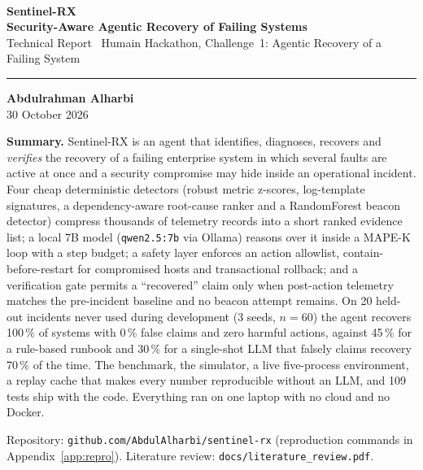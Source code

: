 \documentclass[11pt,a4paper]{article}
\newcommand{\code}[1]{\texttt{#1}}
\newcommand{\pct}[1]{#1\,\%}
\begin{document}
\begin{titlepage}
\thispagestyle{empty}
\vspace*{2.2cm}
\noindent{\color{accent}\rule{\textwidth}{1.2pt}}\\[1.2em]
{\color{accent}\Huge\bfseries Sentinel-RX}\\[0.4em]
{\color{accent}\LARGE\bfseries Security-Aware Agentic Recovery of Failing Systems}\\[1.0em]
{\large Technical Report \textemdash\ Humain Hackathon, Challenge~1: Agentic Recovery of a Failing System}\\[0.6em]
{\color{accent}\rule{\textwidth}{1.2pt}}

\vspace{2.0cm}
{\large\bfseries Abdulrahman Alharbi}\\[0.3em]
{\large 30 October 2026}

\vspace{2.2cm}
\begin{summarybox}
\small\textbf{Summary.}
Sentinel-RX is an agent that identifies, diagnoses, recovers and \emph{verifies} the recovery of a
failing enterprise system in which several faults are active at once and a security compromise may
hide inside an operational incident. Four cheap deterministic detectors (robust metric z-scores,
log-template signatures, a dependency-aware root-cause ranker and a RandomForest beacon detector)
compress thousands of telemetry records into a short ranked evidence list; a local 7B model
(\code{qwen2.5:7b} via Ollama) reasons over it inside a MAPE-K loop with a step budget; a safety layer
enforces an action allowlist, contain-before-restart for compromised hosts and transactional rollback;
and a verification gate permits a ``recovered'' claim only when post-action telemetry matches the
pre-incident baseline and no beacon attempt remains. On 20 held-out incidents never used during
development (3 seeds, $n=60$) the agent recovers \pct{100} of systems with \pct{0} false claims and
zero harmful actions, against \pct{45} for a rule-based runbook and \pct{30} for a single-shot LLM
that falsely claims recovery \pct{70} of the time. The benchmark, the simulator, a live five-process
environment, a replay cache that makes every number reproducible without an LLM, and 109 tests ship
with the code. Everything ran on one laptop with no cloud and no Docker.
\end{summarybox}
\vfill
{\small\color{muted}Repository: \code{github.com/AbdulAlharbi/sentinel-rx} (reproduction commands in Appendix~\ref{app:repro}).
Literature review: \code{docs/literature\_review.pdf}.}
\end{titlepage}
\end{document}
